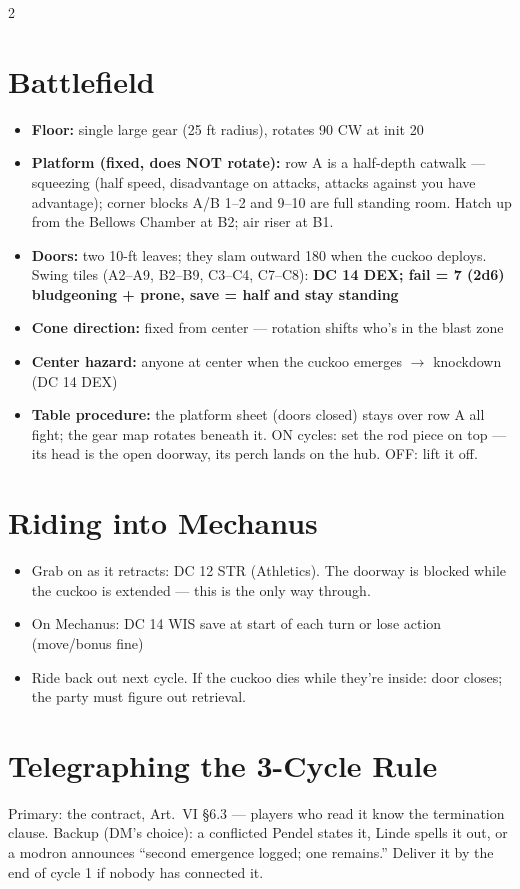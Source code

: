 \documentclass[10pt,letterpaper]{article}
\begin{document}
\begin{multicols}{2}
\columnbreak

\section*{Battlefield}
\begin{itemize}
\item \textbf{Floor:} single large gear (25 ft radius), rotates 90\textdegree{} CW at init 20
\item \textbf{Platform (fixed, does NOT rotate):} row A is a half-depth catwalk --- squeezing (half speed, disadvantage on attacks, attacks against you have advantage); corner blocks A/B 1--2 and 9--10 are full standing room. Hatch up from the Bellows Chamber at B2; air riser at B1.
\item \textbf{Doors:} two 10-ft leaves; they slam outward 180\textdegree{} when the cuckoo deploys. Swing tiles (A2--A9, B2--B9, C3--C4, C7--C8): \textbf{DC 14 DEX; fail = 7 (2d6) bludgeoning + prone, save = half and stay standing}
\item \textbf{Cone direction:} fixed from center --- rotation shifts who's in the blast zone
\item \textbf{Center hazard:} anyone at center when the cuckoo emerges $\to$ knockdown (DC 14 DEX)
\item \textbf{Table procedure:} the platform sheet (doors closed) stays over row A all fight; the gear map rotates beneath it. ON cycles: set the rod piece on top --- its head is the open doorway, its perch lands on the hub. OFF: lift it off.
\end{itemize}

\section*{Riding into Mechanus}
\begin{itemize}
\item Grab on as it retracts: DC 12 STR (Athletics). The doorway is blocked while the cuckoo is extended --- this is the only way through.
\item On Mechanus: DC 14 WIS save at start of each turn or lose action (move/bonus fine)
\item Ride back out next cycle. If the cuckoo dies while they're inside: door closes; the party must figure out retrieval.
\end{itemize}

\section*{Telegraphing the 3-Cycle Rule}
Primary: the contract, Art.\ VI \S6.3 --- players who read it know the termination clause. Backup (DM's choice): a conflicted Pendel states it, Linde spells it out, or a modron announces ``second emergence logged; one remains.'' Deliver it by the end of cycle 1 if nobody has connected it.


\end{multicols}
\end{document}
